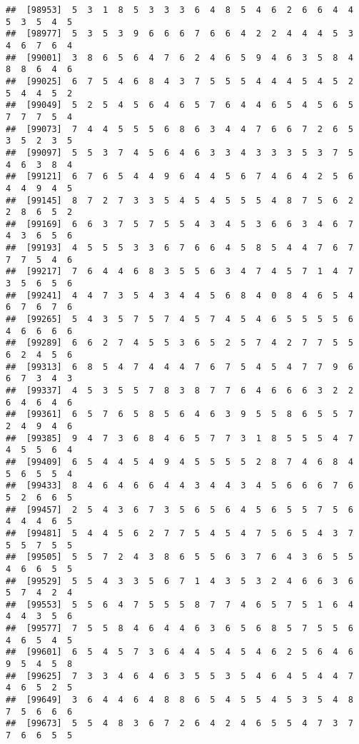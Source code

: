 \documentclass[
]{book}
\begin{document}
\begin{verbatim}
##  [98953]  5  3  1  8  5  3  3  3  6  4  8  5  4  6  2  6  6  4  4  5  3  5  4  5
##  [98977]  5  3  5  3  9  6  6  6  7  6  6  4  2  2  4  4  4  5  3  4  6  7  6  4
##  [99001]  3  8  6  5  6  4  7  6  2  4  6  5  9  4  6  3  5  8  4  8  8  6  4  6
##  [99025]  6  7  5  4  6  8  4  3  7  5  5  5  4  4  4  5  4  5  2  5  4  4  5  2
##  [99049]  5  2  5  4  5  6  4  6  5  7  6  4  4  6  5  4  5  6  5  7  7  7  5  4
##  [99073]  7  4  4  5  5  5  6  8  6  3  4  4  7  6  6  7  2  6  5  3  5  2  3  5
##  [99097]  5  5  3  7  4  5  6  4  6  3  3  4  3  3  3  5  3  7  5  4  6  3  8  4
##  [99121]  6  7  6  5  4  4  9  6  4  4  5  6  7  4  6  4  2  5  6  4  4  9  4  5
##  [99145]  8  7  2  7  3  3  5  4  5  4  5  5  5  4  8  7  5  6  2  2  8  6  5  2
##  [99169]  6  6  3  7  5  7  5  5  4  3  4  5  3  6  6  3  4  6  7  4  3  6  5  6
##  [99193]  4  5  5  5  3  3  6  7  6  6  4  5  8  5  4  4  7  6  7  7  7  5  4  6
##  [99217]  7  6  4  4  6  8  3  5  5  6  3  4  7  4  5  7  1  4  7  3  5  6  5  6
##  [99241]  4  4  7  3  5  4  3  4  4  5  6  8  4  0  8  4  6  5  4  6  7  6  7  6
##  [99265]  5  4  3  5  7  5  7  4  5  7  4  5  4  6  5  5  5  5  6  4  6  6  6  6
##  [99289]  6  6  2  7  4  5  5  3  6  5  2  5  7  4  2  7  7  5  5  6  2  4  5  6
##  [99313]  6  8  5  4  7  4  4  4  7  6  7  5  4  5  4  7  7  9  6  6  7  3  4  3
##  [99337]  4  5  3  5  5  7  8  3  8  7  7  6  4  6  6  6  3  2  2  6  4  6  4  6
##  [99361]  6  5  7  6  5  8  5  6  4  6  3  9  5  5  8  6  5  5  7  2  4  9  4  6
##  [99385]  9  4  7  3  6  8  4  6  5  7  7  3  1  8  5  5  5  4  7  4  5  5  6  4
##  [99409]  6  5  4  4  5  4  9  4  5  5  5  5  2  8  7  4  6  8  4  5  6  5  5  4
##  [99433]  8  4  6  4  6  6  4  4  3  4  4  3  4  5  6  6  6  7  6  5  2  6  6  5
##  [99457]  2  5  4  3  6  7  3  5  6  5  6  4  5  6  5  5  7  5  6  4  4  4  6  5
##  [99481]  5  4  4  5  6  2  7  7  5  4  5  4  7  5  6  5  4  3  7  5  5  7  5  5
##  [99505]  5  5  7  2  4  3  8  6  5  5  6  3  7  6  4  3  6  5  5  4  6  6  5  5
##  [99529]  5  5  4  3  3  5  6  7  1  4  3  5  3  2  4  6  6  3  6  5  7  4  2  4
##  [99553]  5  5  6  4  7  5  5  5  8  7  7  4  6  5  7  5  1  6  4  4  4  3  5  6
##  [99577]  7  5  5  8  4  6  4  4  6  3  6  5  6  8  5  7  5  5  6  4  6  5  4  5
##  [99601]  6  5  4  5  7  3  6  4  4  5  4  5  4  6  2  5  6  4  6  9  5  4  5  8
##  [99625]  7  3  3  4  6  4  6  3  5  5  3  5  4  6  4  5  4  4  7  4  6  5  2  5
##  [99649]  3  6  4  4  6  4  8  8  6  5  4  5  5  4  5  3  5  4  8  7  5  6  6  6
##  [99673]  5  5  4  8  3  6  7  2  6  4  2  4  6  5  5  4  7  3  7  7  6  6  5  5

\end{verbatim}
\end{document}
